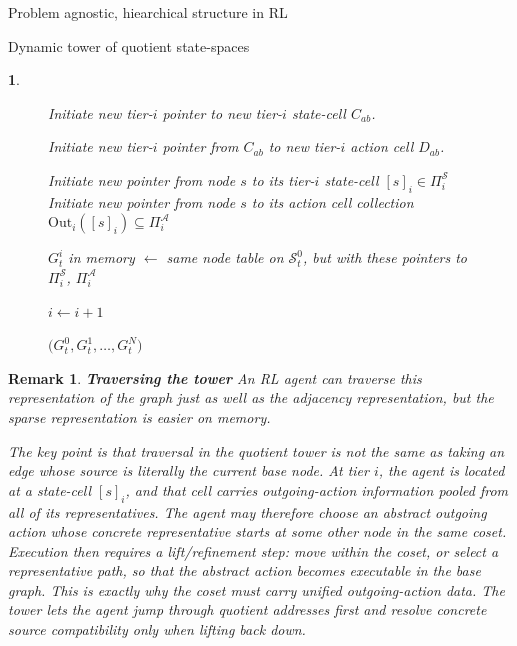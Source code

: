 \documentclass[11pt]{article}
\newtheorem{remark}[subsubsection]{Remark}
\newtheorem{ermark}[subsubsection]{}
\begin{document}
\begin{section}{Problem agnostic, hiearchical structure in RL}
\begin{subsection}{Dynamic tower of quotient state-spaces}
\begin{ermark}
\begin{figure}[!h]
\begin{algorithm}[H]
\begin{algorithmic}[1]

                \State Initiate new tier-$i$ pointer to new tier-$i$ state-cell $C_{ab}$.

                \State Initiate new tier-$i$ pointer from $C_{ab}$ to new tier-$i$ action cell $D_{ab}$.
                \EndFor
            \EndIf
        \EndFor

            \State Initiate new pointer from node $s$  to its tier-$i$ state-cell $[s]_i\in\Pi_i^{\mathcal S}$
            \State Initiate new pointer from node $s$  to its action cell collection $\mathrm{Out}_i([s]_i)\subseteq\Pi_i^{\mathcal A}$
        \EndFor

        \State $G_t^i$ in memory $\gets$ same node table on $\mathcal{S}_t^0$, but with these pointers to $\Pi_i^{\mathcal S}$, $\Pi_i^{\mathcal A}$

        \State $i \gets i+1$

    \EndWhile

    \State \Return $\bigl(
    G_t^0,G_t^1,\dots,G_t^N
    \bigr)$
\EndFunction

\end{algorithmic}
\end{algorithm}
    \label{fig: algorithm 1}
\end{figure}

\end{ermark}

\begin{remark}
{\bf Traversing the tower}
\normalfont
An RL agent can traverse this representation of the graph just as well as the adjacency representation, but the sparse representation is easier on memory.

The key point is that traversal in the quotient tower is not the same as taking an edge whose source is literally the current base node. At tier $i$, the agent is located at a state-cell $[s]_i$, and that cell carries outgoing-action information pooled from all of its representatives. The agent may therefore choose an abstract outgoing action whose concrete representative starts at some other node in the same coset. Execution then requires a lift/refinement step: move within the coset, or select a representative path, so that the abstract action becomes executable in the base graph. This is exactly why the coset must carry unified outgoing-action data. The tower lets the agent jump through quotient addresses first and resolve concrete source compatibility only when lifting back down.
\end{remark}


\end{subsection}
\end{section}
\end{document}
